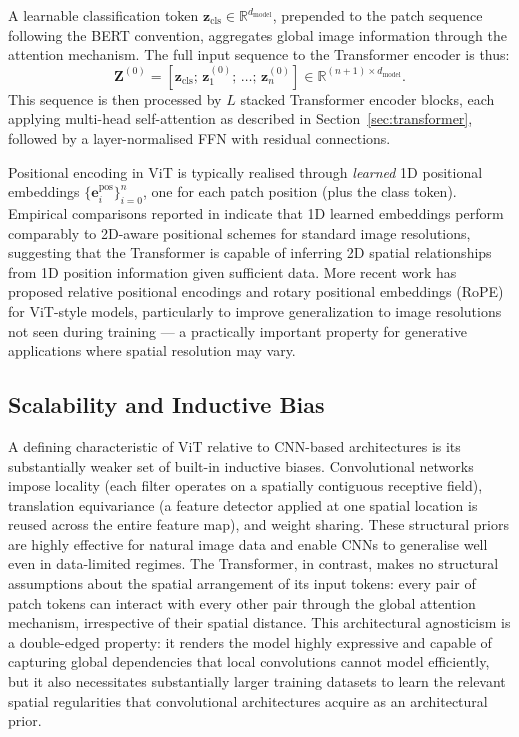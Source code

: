 A learnable classification token $\mathbf{z}_{\text{cls}} \in \mathbb{R}^{d_{\text{model}}}$, prepended to the patch sequence following the BERT convention, aggregates global image information through the attention mechanism. The full input sequence to the Transformer encoder is thus:
\begin{equation}
    \mathbf{Z}^{(0)} = \left[\mathbf{z}_{\text{cls}};\, \mathbf{z}_1^{(0)};\, \ldots;\, \mathbf{z}_n^{(0)}\right] \in \mathbb{R}^{(n+1) \times d_{\text{model}}}.
    \label{eq:vit_input}
\end{equation}
This sequence is then processed by $L$ stacked Transformer encoder blocks, each applying multi-head self-attention as described in Section~\ref{sec:transformer}, followed by a layer-normalised FFN with residual connections.

Positional encoding in ViT is typically realised through \emph{learned} 1D positional embeddings $\{\mathbf{e}_i^{\text{pos}}\}_{i=0}^{n}$, one for each patch position (plus the class token). Empirical comparisons reported in \cite{dosovitskiy2020image} indicate that 1D learned embeddings perform comparably to 2D-aware positional schemes for standard image resolutions, suggesting that the Transformer is capable of inferring 2D spatial relationships from 1D position information given sufficient data. More recent work has proposed relative positional encodings and rotary positional embeddings (RoPE) for ViT-style models, particularly to improve generalization to image resolutions not seen during training — a practically important property for generative applications where spatial resolution may vary.


\subsection{Scalability and Inductive Bias}
\label{subsec:vit_scalability}

A defining characteristic of ViT relative to CNN-based architectures is its substantially weaker set of built-in inductive biases. Convolutional networks impose locality (each filter operates on a spatially contiguous receptive field), translation equivariance (a feature detector applied at one spatial location is reused across the entire feature map), and weight sharing. These structural priors are highly effective for natural image data and enable CNNs to generalise well even in data-limited regimes. The Transformer, in contrast, makes no structural assumptions about the spatial arrangement of its input tokens: every pair of patch tokens can interact with every other pair through the global attention mechanism, irrespective of their spatial distance. This architectural agnosticism is a double-edged property: it renders the model highly expressive and capable of capturing global dependencies that local convolutions cannot model efficiently, but it also necessitates substantially larger training datasets to learn the relevant spatial regularities that convolutional architectures acquire as an architectural prior.

